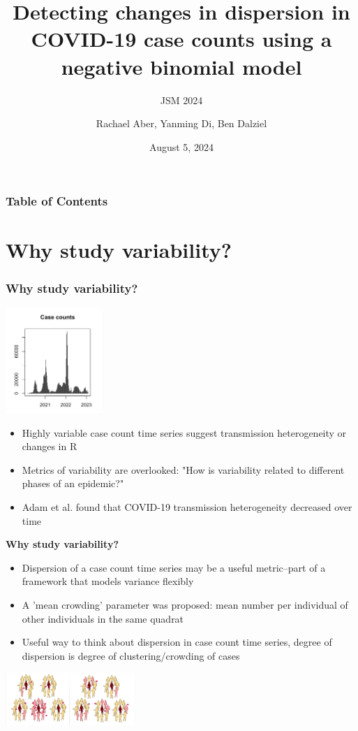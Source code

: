 \documentclass{beamer}
\title{\textbf{Detecting changes in dispersion in COVID-19 case counts using a negative binomial model}}
\subtitle{JSM 2024}
\author{Rachael Aber, Yanming Di, Ben Dalziel}
\date{August 5, 2024}
\begin{document}
\frame{\titlepage}

\begin{frame}
	\frametitle{Table of Contents}
	\tableofcontents
\end{frame}

\section{Why study variability?}
	
\begin{frame}
\frametitle{Why study variability?}
\includegraphics[height=4cm]{var}
\begin{itemize}[<+->] %
			\item Highly variable case count time series suggest transmission heterogeneity or changes in R
			\item Metrics of variability are overlooked: "How is variability related to different phases of an epidemic?"\cite{graham_measles_2019}
			\item Adam et al.\cite{adam_time-varying_2022} found that COVID-19 transmission heterogeneity decreased over time
	\end{itemize}
\end{frame}

\begin{frame}{\textbf{Why study variability?}}
    \begin{itemize}[<+->] %
		\item Dispersion of a case count time series may be a useful metric--part of a framework that models variance flexibly
		\item A 'mean crowding' parameter \cite{lloyd_mean_1967} was proposed: mean number per individual of other individuals in the same quadrat 
		\item Useful way to think about dispersion in case count time series, degree of dispersion is degree of clustering/crowding of cases
    \end{itemize}
		\includegraphics[height=2cm]{sup} \cite{nielsen_counterintuitive_2023}
\end{frame}
\end{document}
